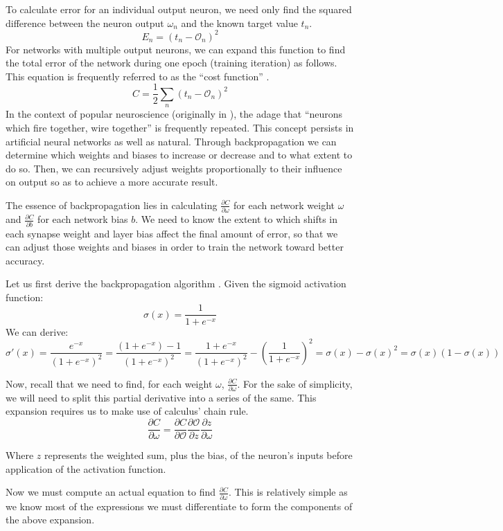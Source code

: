 \documentclass{article}
\begin{document}
To calculate error for an individual output neuron, we need only find the squared difference between the neuron output $\omega_n$ and the known target value $t_n$.
$$E_n=(t_n-\mathcal{O}_n)^2$$
For networks with multiple output neurons, we can expand this function to find the total error of the network during one epoch (training iteration) as follows. This equation is frequently referred to as the ``cost function'' \cite{mediummlbasics}.
$$C=\frac{1}{2}\sum_n(t_n-\mathcal{O}_n)^2$$
In the context of popular neuroscience (originally in \cite{neuronsfire}), the adage that ``neurons which fire together, wire together'' is frequently repeated. This concept persists in artificial neural networks as well as natural. Through backpropagation we can determine which weights and biases to increase or decrease and to what extent to do so. Then, we can recursively adjust weights proportionally to their influence on output so as to achieve a more accurate result.

The essence of backpropagation lies in calculating $\frac{\partial{C}}{\partial{\omega}}$ for each network weight $\omega$ and $\frac{\partial{C}}{\partial{b}}$ for each network bias $b$. We need to know the extent to which shifts in each synapse weight and layer bias affect the final amount of error, so that we can adjust those weights and biases in order to train the network toward better accuracy.

Let us first derive the backpropagation algorithm \cite{derivebackprop}. Given the sigmoid activation function:
$$\sigma(x)=\frac{1}{1+e^{-x}}$$
We can derive:
$$\sigma'(x)=\frac{e^{-x}}{(1+e^{-x})^2}=\frac{(1+e^{-x})-1}{(1+e^{-x})^2}=\frac{1+e^{-x}}{(1+e^{-x})^2}-\left(\frac{1}{1+e^{-x}}\right)^2=\sigma(x)-\sigma(x)^2=\sigma(x)(1-\sigma(x))$$

Now, recall that we need to find, for each weight $\omega$, $\frac{\partial{C}}{\partial{\omega}}$. For the sake of simplicity, we will need to split this partial derivative into a series of the same. This expansion requires us to make use of calculus' chain rule.
$$\frac{\partial{C}}{\partial{\omega}}=\frac{ \partial{C} }{ \partial{\mathcal{O}} }
                                        \frac{ \partial{\mathcal{O}} }{ \partial{z} }
                                         \frac{ \partial{z} }{ \partial{\omega} }$$

Where $z$ represents the weighted sum, plus the bias, of the neuron's inputs before application of the activation function.

Now we must compute an actual equation to find $\frac{\partial{C}}{\partial{\omega}}$. This is relatively simple as we know most of the expressions we must differentiate to form the components of the above expansion.
\end{document}
